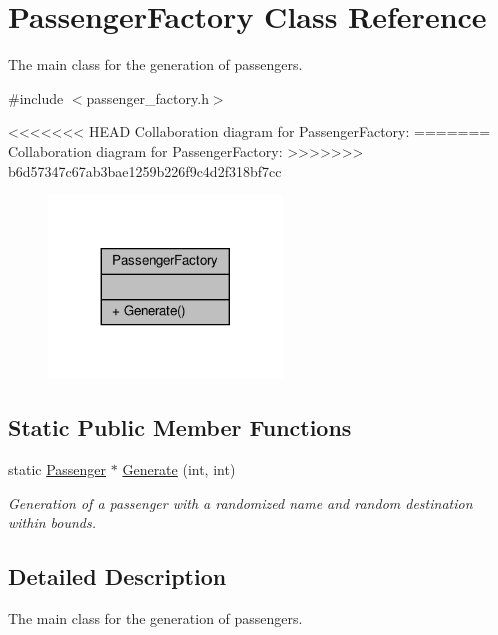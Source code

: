 \hypertarget{classPassengerFactory}{}\section{Passenger\+Factory Class Reference}
\label{classPassengerFactory}


The main class for the generation of passengers.  




{\ttfamily \#include $<$passenger\+\_\+factory.\+h$>$}



<<<<<<< HEAD
Collaboration diagram for Passenger\+Factory\+:\nopagebreak
=======
Collaboration diagram for Passenger\+Factory\+:
\nopagebreak
>>>>>>> b6d57347c67ab3bae1259b226f9c4d2f318bf7cc
\begin{figure}[H]
\begin{center}
\leavevmode
\includegraphics[width=176pt]{classPassengerFactory__coll__graph}
\end{center}
\end{figure}
\subsection*{Static Public Member Functions}
\begin{DoxyCompactItemize}
\item 
static \hyperlink{classPassenger}{Passenger} $\ast$ \hyperlink{classPassengerFactory_a2952ba78ceb285f445bc768d287230d2}{Generate} (int, int)
\begin{DoxyCompactList}\small\item\em Generation of a passenger with a randomized name and random destination within bounds. \end{DoxyCompactList}\end{DoxyCompactItemize}


\subsection{Detailed Description}
The main class for the generation of passengers. 

